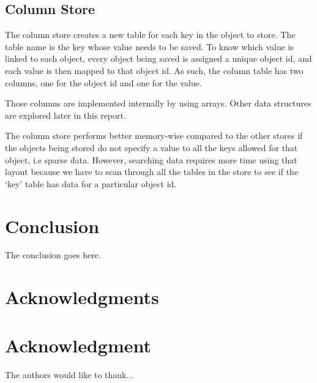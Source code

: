 \documentclass[11pt,journal,compsoc]{IEEEtran}
\begin{document}
\subsection{Column Store}
The column store creates a new table for each key in the object to store. The
table name is the key whose value needs to be saved. To know which value is
linked to each object, every object being saved is assigned a unique object id,
and each value is then mapped to that object id. As such, the column table has
two columns, one for the object id and one for the value.


Those columns are implemented internally by using arrays. Other data structures
are explored later in this report.


The column store performs better memory-wise compared to the other stores if the
objects being stored do not specify a value to all the keys allowed for that
object, i.e sparse data. However, searching data requires more time using that
layout because we have to scan through all the tables in the store to see if the
‘key’ table has data for a particular object id.

\section{Conclusion}
The conclusion goes here.

\ifCLASSOPTIONcompsoc
  \section*{Acknowledgments}
\else
  \section*{Acknowledgment}
\fi

The authors would like to thank...

\ifCLASSOPTIONcaptionsoff
  \newpage
\fi


%
%
%

\end{document}
